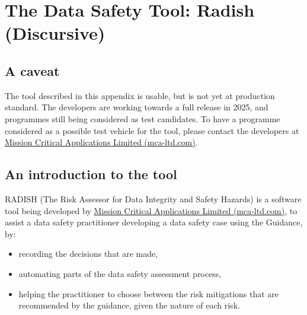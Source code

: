%
%
\section{The Data Safety Tool: Radish (Discursive)} \label{bkm:radish}


\subsection{A caveat}
The tool described in this appendix is usable, but is not yet at production standard.
The developers are working towards a full release in 2025,
and programmes still being considered as test candidates.
To have a programme considered as a possible test vehicle for the tool,
please contact the developers at
\href{https://mca-ltd.com/}{Mission Critical Applications Limited (mca-ltd.com)}.

\subsection{An introduction to the tool}
RADISH (The Risk Assessor for Data Integrity and Safety Hazards) is a software tool being developed by \href{https://mca-ltd.com/}{Mission Critical Applications Limited (mca-ltd.com)}, to assist a data safety practitioner developing a data safety case using the Guidance, by:
\begin{itemize}
  \item recording the decisions that are made,
  \item automating parts of the data safety assessment process,
  \item helping the practitioner to choose between the risk mitigations that are recommended by the guidance, given the nature of each risk.
\end{itemize}

